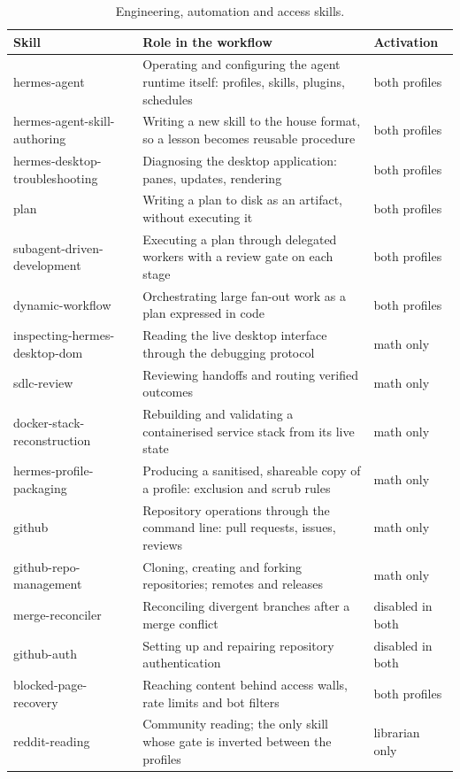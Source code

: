 \documentclass[10pt]{article}
\begin{document}
\begin{table}[htbp]
\centering\footnotesize
\caption{Engineering, automation and access skills.}\label{tab:skillseng}
\renewcommand{\arraystretch}{1.15}
\begin{tabularx}{\textwidth}{@{}>{\raggedright\arraybackslash}p{3.5cm} X >{\raggedright\arraybackslash}p{2.3cm}@{}}
\toprule
\textbf{Skill} & \textbf{Role in the workflow} & \textbf{Activation} \\
\midrule
hermes-agent & Operating and configuring the agent runtime itself: profiles, skills, plugins, schedules & both profiles \\
hermes-agent-skill-authoring & Writing a new skill to the house format, so a lesson becomes reusable procedure & both profiles \\
hermes-desktop-troubleshooting & Diagnosing the desktop application: panes, updates, rendering & both profiles \\
plan & Writing a plan to disk as an artifact, without executing it & both profiles \\
subagent-driven-development & Executing a plan through delegated workers with a review gate on each stage & both profiles \\
dynamic-workflow & Orchestrating large fan-out work as a plan expressed in code & both profiles \\
inspecting-hermes-desktop-dom & Reading the live desktop interface through the debugging protocol & math only \\
sdlc-review & Reviewing handoffs and routing verified outcomes & math only \\
docker-stack-reconstruction & Rebuilding and validating a containerised service stack from its live state & math only \\
hermes-profile-packaging & Producing a sanitised, shareable copy of a profile: exclusion and scrub rules & math only \\
github & Repository operations through the command line: pull requests, issues, reviews & math only \\
github-repo-management & Cloning, creating and forking repositories; remotes and releases & math only \\
merge-reconciler & Reconciling divergent branches after a merge conflict & disabled in both \\
github-auth & Setting up and repairing repository authentication & disabled in both \\
blocked-page-recovery & Reaching content behind access walls, rate limits and bot filters & both profiles \\
reddit-reading & Community reading; the only skill whose gate is inverted between the profiles & librarian only \\
\bottomrule
\end{tabularx}
\end{table}
\end{document}
